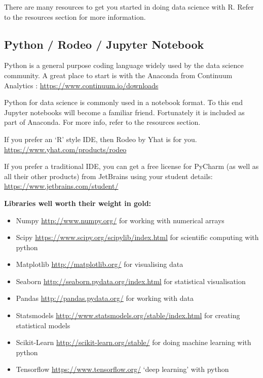 \documentclass[]{book}
\providecommand{\tightlist}{%
  \setlength{\itemsep}{0pt}\setlength{\parskip}{0pt}}
\theoremstyle{definition}
\theoremstyle{definition}
\theoremstyle{remark}
\begin{document}
There are many resources to get you started in doing data science with
R. Refer to the resources section for more information.

\subsection{Python / Rodeo / Jupyter
Notebook}\label{python-rodeo-jupyter-notebook}

Python is a general purpose coding language widely used by the data
science community. A great place to start is with the Anaconda from
Continuum Analytics : \url{https://www.continuum.io/downloads}

Python for data science is commonly used in a notebook format. To this
end Jupyter notebooks will become a familiar friend. Fortunately it is
included as part of Anaconda. For more info, refer to the resources
section.

If you prefer an `R' style IDE, then Rodeo by Yhat is for you.
\url{https://www.yhat.com/products/rodeo}

If you prefer a traditional IDE, you can get a free license for PyCharm
(as well as all their other products) from JetBrains using your student
details: \url{https://www.jetbrains.com/student/}

\textbf{Libraries well worth their weight in gold:}

\begin{itemize}
\tightlist
\item
  Numpy \url{http://www.numpy.org/} for working with numerical arrays
\item
  Scipy \url{https://www.scipy.org/scipylib/index.html} for scientific
  computing with python
\item
  Matplotlib \url{http://matplotlib.org/} for visualising data
\item
  Seaborn \url{http://seaborn.pydata.org/index.html} for statistical
  visualisation
\item
  Pandas \url{http://pandas.pydata.org/} for working with data
\item
  Statsmodels \url{http://www.statsmodels.org/stable/index.html} for
  creating statistical models
\item
  Scikit-Learn \url{http://scikit-learn.org/stable/} for doing machine
  learning with python
\item
  Tensorflow \url{https://www.tensorflow.org/} `deep learning' with
  python
\end{itemize}
\end{document}
